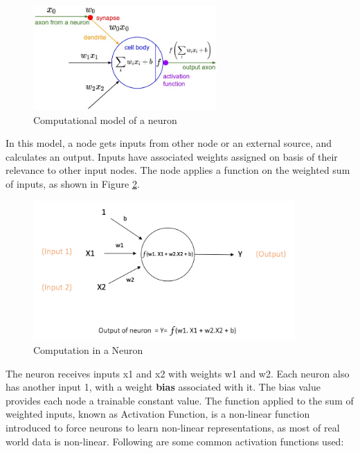 \begin{figure}[h!]
\centering
\includegraphics[width=7cm]{figures/neuron_model.jpg}
\caption{Computational model of a neuron \cite{nn_stanford_1}}
\label{fig:cnn2}
\end{figure}

In this model, a node gets inputs from other node or an external source, and calculates an output. Inputs have associated weights assigned on basis of their relevance to other input nodes. The node applies a function on the weighted sum of inputs, as shown in Figure \ref{fig:cnn3}.
\begin{figure}[h!]
\centering
\includegraphics[width=10cm]{figures/Input_and_Output_to_a_Node.png}
\caption{Computation in a Neuron\cite{nn_karn}}
\label{fig:cnn3}
\end{figure}

The neuron receives inputs x1 and x2 with weights w1 and w2. Each neuron also has another input 1, with a weight \textbf{bias} associated with it. The bias value provides each node a trainable constant value.\newline\newline 
The function applied to the sum of weighted inputs, known as Activation Function, is a non-linear function introduced to force neurons to learn non-linear representations, as most of real world data is non-linear. Following are some common activation functions used:

